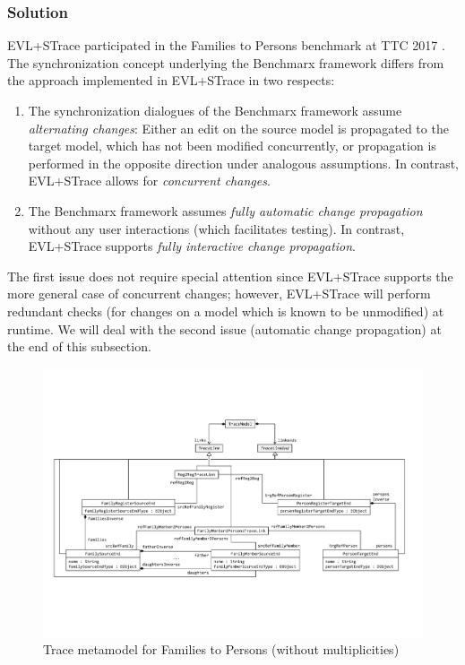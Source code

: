 \subsubsection{Solution}
\label{sec:solutionEVL}

EVL+STrace participated in the Families to Persons benchmark at TTC 2017 \cite{Samimi-Dehkordi2017}. The synchronization concept underlying the Benchmarx framework differs from the approach implemented in EVL+STrace in two respects:

\begin{enumerate}
	\item The synchronization dialogues of the Benchmarx framework assume \emph{alternating changes}: Either an edit on the source model is propagated to the target model, which has not been modified concurrently, or propagation is performed in the opposite direction under analogous assumptions. In contrast, EVL+STrace allows for \emph{concurrent changes}.
	\item The Benchmarx framework assumes \emph{fully automatic change propagation} without any user interactions (which facilitates testing). In contrast, EVL+STrace supports \emph{fully interactive change propagation}.
\end{enumerate}

The first issue does not require special attention since EVL+STrace supports the more general case of concurrent changes; however, EVL+STrace will perform redundant checks (for changes on a model which is known to be unmodified) at runtime. We will deal with the second issue (automatic change propagation) at the end of this subsection. 

\begin{figure}[tb!]
	\centering
	\includegraphics[width=\textwidth]{diagrams/EVLPlusSTraceMetamodel}
	\caption{Trace metamodel for Families to Persons (without multiplicities)}
	\label{fig:evltracemetamodel}
\end{figure}

